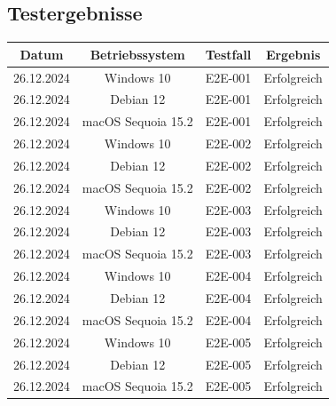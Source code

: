 \documentclass[a4paper,12pt]{report}
\begin{document}
    \subsection{Testergebnisse}
    \begin{table}[h!]
        \centering
        \setlength{\leftmargini}{0.4cm}
        \begin{tabular}{|c|c|c|c|}
            \hline
            \textbf{Datum} & \textbf{Betriebssystem} & \textbf{Testfall} & \textbf{Ergebnis} \\ \hline
            26.12.2024     & Windows 10              & E2E-001           & Erfolgreich       \\ \hline
            26.12.2024     & Debian 12               & E2E-001           & Erfolgreich       \\ \hline
            26.12.2024     & macOS Sequoia 15.2      & E2E-001           & Erfolgreich       \\ \hline
            26.12.2024     & Windows 10              & E2E-002           & Erfolgreich       \\ \hline
            26.12.2024     & Debian 12               & E2E-002           & Erfolgreich       \\ \hline
            26.12.2024     & macOS Sequoia 15.2      & E2E-002           & Erfolgreich       \\ \hline
            26.12.2024     & Windows 10              & E2E-003           & Erfolgreich       \\ \hline
            26.12.2024     & Debian 12               & E2E-003           & Erfolgreich       \\ \hline
            26.12.2024     & macOS Sequoia 15.2      & E2E-003           & Erfolgreich       \\ \hline
            26.12.2024     & Windows 10              & E2E-004           & Erfolgreich       \\ \hline
            26.12.2024     & Debian 12               & E2E-004           & Erfolgreich       \\ \hline
            26.12.2024     & macOS Sequoia 15.2      & E2E-004           & Erfolgreich       \\ \hline
            26.12.2024     & Windows 10              & E2E-005           & Erfolgreich       \\ \hline
            26.12.2024     & Debian 12               & E2E-005           & Erfolgreich       \\ \hline
            26.12.2024     & macOS Sequoia 15.2      & E2E-005           & Erfolgreich       \\ \hline

\end{tabular}
\end{table}
\end{document}
